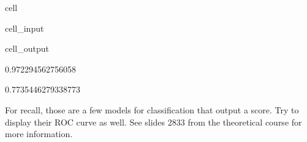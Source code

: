 \documentclass[letterpaper,10pt,english]{jupyterBook}
\begin{document}
\begin{sphinxuseclass}{cell}
\begin{sphinxVerbatimInput}
\begin{sphinxuseclass}{cell_input}
\begin{sphinxVerbatim}[commandchars=\\\{\}]
\PYG{p}{[} \PYG{p}{]} \PYG{p}{[} \PYG{p}{]}  
\PYG{p}{[} \PYG{p}{]}
\end{sphinxVerbatim}

\end{sphinxuseclass}\end{sphinxVerbatimInput}
\begin{sphinxVerbatimOutput}

\begin{sphinxuseclass}{cell_output}
\begin{sphinxVerbatim}[commandchars=\\\{\}]
0.972294562756058
\end{sphinxVerbatim}

\begin{sphinxVerbatim}[commandchars=\\\{\}]
0.7735446279338773
\end{sphinxVerbatim}

\noindent{}

\end{sphinxuseclass}\end{sphinxVerbatimOutput}

\end{sphinxuseclass}
\sphinxAtStartPar
For recall, those are a few models for classification that output a score. Try to display their ROC curve as well. See slides 28\sphinxhyphen{}33 from the theoretical course for more information.
\end{document}
